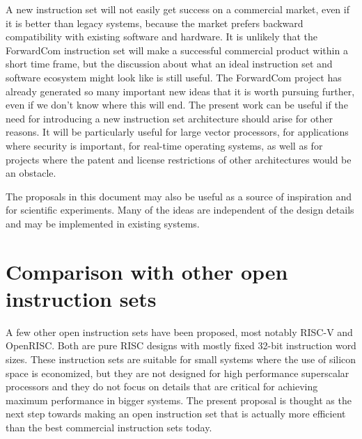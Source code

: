 \documentclass[forwardcom.tex]{subfiles}
\begin{document}
A new instruction set will not easily get success on a commercial market, even if it is better than legacy systems, because the market prefers backward compatibility with existing software and hardware. It is unlikely that the ForwardCom instruction set will make a successful commercial product within a short time frame, but the discussion about what an ideal instruction set and software ecosystem might look like is still useful. The ForwardCom project has already generated so many important new ideas that it is worth pursuing further, even if we don't know where this will end. The present work can be useful if the need for introducing a new instruction set architecture should arise for other reasons. It will be particularly useful for large vector processors, for applications where security is important, for real-time operating systems, as well as for projects where the patent and license restrictions of other architectures would be an obstacle.
\vspace{2mm}

The proposals in this document may also be useful as a source of inspiration and for scientific experiments. Many of the ideas are independent of the design details and may be implemented in existing systems.

\section{Comparison with other open instruction sets}
A few other open instruction sets have been proposed, most notably RISC-V and OpenRISC. Both are pure RISC designs with mostly fixed 32-bit instruction word sizes. These instruction sets are suitable for small systems where the use of silicon space is economized, but they are not designed for high performance superscalar processors and they do not focus on details that are critical for achieving maximum performance in bigger systems. The present proposal is thought as the next step towards making an open instruction set that is actually more efficient than the best commercial instruction sets today.
\vspace{2mm}
\end{document}
